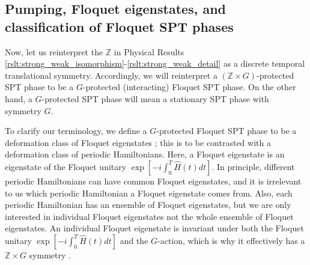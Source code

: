 \documentclass[sort&compress]{elsarticle}
\theoremstyle{theoremstyle}
\theoremstyle{framedtheoremstyle}
\theoremstyle{definitionstyle}
\theoremstyle{definitionstyle}
\theoremstyle{definitionstyle}
\theoremstyle{definitionstyle}
\theoremstyle{nameddefinitionstyle}
\theoremstyle{framednameddefinitionstyle}
\theoremstyle{proofstyle}
\theoremstyle{definitionstyle}
\newcommand{\ZZZ}{\mathbb{Z}}
\newcommand{\paren}[1]{\left( #1 \right)}
\newcommand{\brackets}[1]{\left[ #1 \right]}
\begin{document}





\subsection{Pumping, Floquet eigenstates, and classification of Floquet SPT phases\label{subsec:pumping_Floquet_eigenstates_classification_Floquet_SPT_phases}}

Now, let us reinterpret the $\ZZZ$ in Physical Results \ref{rslt:strong_weak_isomorphism}-\ref{rslt:strong_weak_detail} as a discrete temporal translational symmetry. Accordingly, we will reinterpret a $\paren{\ZZZ\times G}$-protected SPT phase to be a $G$-protected (interacting) Floquet SPT phase. On the other hand, a $G$-protected SPT phase will mean a stationary SPT phase with symmetry $G$.

To clarify our terminology, we define a $G$-protected Floquet SPT phase to be a deformation class of Floquet eigenstates \cite{Else_Floquet}; this is to be contrasted with a deformation class of periodic Hamiltonians. Here, a Floquet eigenstate is an eigenstate of the Floquet unitary $\exp\brackets{-i \int_0^T \hat H(t) dt}$. In principle, different periodic Hamiltonians can have common Floquet eigenstates, and it is irrelevant to us which periodic Hamiltonian a Floquet eigenstate comes from. Also, each periodic Hamiltonian has an ensemble of Floquet eigenstates, but we are only interested in individual Floquet eigenstates not the whole ensemble of Floquet eigenstates. An individual Floquet eigenstate is invariant under both the Floquet unitary $\exp\brackets{-i \int_0^T \hat H(t) dt}$ and the $G$-action, which is why it effectively has a $\ZZZ \times G$ symmetry \cite{Else_Floquet}.
\end{document}
